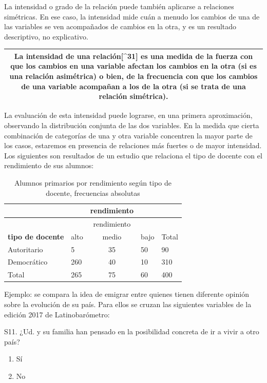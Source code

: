 \documentclass[]{book}
\providecommand{\tightlist}{%
  \setlength{\itemsep}{0pt}\setlength{\parskip}{0pt}}
\begin{document}
La intensidad o grado de la relación puede también aplicarse a
relaciones simétricas. En ese caso, la intensidad mide cuán a menudo los
cambios de una de las variables se ven acompañados de cambios en la
otra, y es un resultado descriptivo, no explicativo.

\begin{longtable}[]{@{}c@{}}
\toprule
\endhead
\begin{minipage}[t]{0.97\columnwidth}\centering
La \textbf{intensidad de una relación}{[}\^{}31{]} es una medida de la fuerza con que los cambios en una variable afectan los cambios en la otra (si es una relación asimétrica) o bien, de la frecuencia con que los cambios de una variable acompañan a los de la otra (si se trata de una relación simétrica).\strut
\end{minipage}\tabularnewline
\bottomrule
\end{longtable}

La evaluación de esta intensidad puede lograrse, en una primera
aproximación, observando la distribución conjunta de las dos variables.
En la medida que cierta combinación de categorías de una y otra variable
concentren la mayor parte de los casos, estaremos en presencia de
relaciones más fuertes o de mayor intensidad. Los siguientes son
resultados de un estudio que relaciona el tipo de docente con el
rendimiento de sus alumnos:

\begin{longtable}[]{@{}llcll@{}}
\caption{\label{tab:unnamed-chunk-113}Alumnos primarios por rendimiento según tipo de docente, frecuencias absolutas}\tabularnewline
\toprule
& & rendimiento & &\tabularnewline
\midrule
\endfirsthead
\toprule
& & rendimiento & &\tabularnewline
\midrule
\endhead
\textbf{tipo de docente} & alto & medio & bajo & Total\tabularnewline
Autoritario & 5 & 35 & 50 & 90\tabularnewline
Democrático & 260 & 40 & 10 & 310\tabularnewline
Total & 265 & 75 & 60 & 400\tabularnewline
\bottomrule
\end{longtable}

Ejemplo: se compara la idea de emigrar entre quienes tienen diferente opinión sobre la evolución de su país. Para ellos se cruzan las siguientes variables de la edición 2017 de Latinobarómetro:

S11. ¿Ud. y su familia han pensado en la posibilidad
concreta de ir a vivir a otro país?

\begin{enumerate}
\def\labelenumi{\arabic{enumi}.}
\tightlist
\item
  Sí
\item
  No
\end{enumerate}
\end{document}
